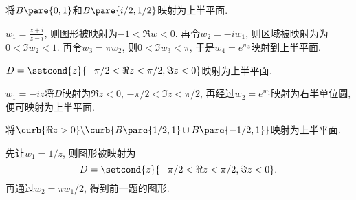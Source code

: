 \documentclass[../ComplexVariable.tex]{subfiles}
\begin{document}
\begin{sample}
    \begin{ex}
        将$B\pare{0,1}$和$B\pare{i/2,1/2}$映射为上半平面.
    \end{ex}
    \begin{solution}
        $\displaystyle w_1 = \frac{z+i}{z-i}$, 则图形被映射为$-1<\Re w<0$. 再令$w_2 = -iw_1$, 则区域被映射为为$0<\Im w_2 < 1$. 再令$w_3 = \pi w_2$, 则$0<\Im w_3<\pi$, 于是$w_4=e^{w_3}$映射到上半平面.
    \end{solution}
\end{sample}
\begin{sample}
    \begin{ex}
        $D=\setcond{z}{-\pi/2 < \Re z < \pi/2, \Im z < 0}$映射为上半平面.
    \end{ex}
    \begin{solution}
        $w_1 = -i z$将$D$映射为$\Re z < 0$, $-\pi/2<\Im z < \pi/2$, 再经过$w_2 = e^{w_1}$映射为右半单位圆, 便可映射为上半平面.
    \end{solution}
\end{sample}
\begin{sample}
    \begin{ex}
        将$\curb{\Re z > 0}\backslash \curb{B\pare{1/2,1}\cup B\pare{-1/2,1}}$映射为上半平面.
    \end{ex}
    \begin{solution}
        先让$w_1 = 1/z$, 则图形被映射为
        \[ D=\setcond{z}{-\pi/2 < \Re z < \pi/2, \Im z < 0}. \]
        再通过$w_2 = \pi w_1/2$, 得到前一题的图形.
    \end{solution}
\end{sample}


\end{document}
